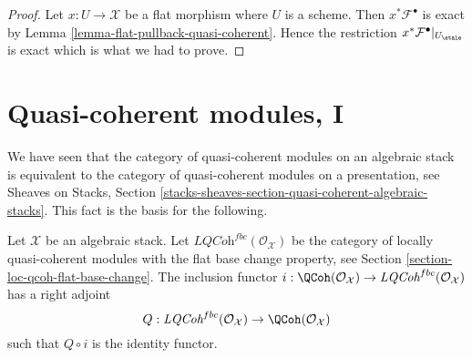\begin{proof}
Let $x : U \to \mathcal{X}$ be a flat morphism where $U$ is a scheme.
Then $x^*\mathcal{F}^\bullet$ is exact by
Lemma \ref{lemma-flat-pullback-quasi-coherent}.
Hence the restriction $x^*\mathcal{F}^\bullet|_{U_\etale}$
is exact which is what we had to prove.
\end{proof}





\section{Quasi-coherent modules, I}
\label{section-quasi-coherent}

\noindent
We have seen that the category of quasi-coherent modules on an algebraic
stack is equivalent to the category of quasi-coherent modules on a
presentation, see
Sheaves on Stacks, Section
\ref{stacks-sheaves-section-quasi-coherent-algebraic-stacks}.
This fact is the basis for the following.

\begin{lemma}
\label{lemma-adjoint}
Let $\mathcal{X}$ be an algebraic stack. Let
$\textit{LQCoh}^{fbc}(\mathcal{O}_\mathcal{X})$
be the category of locally quasi-coherent modules with the
flat base change property, see
Section \ref{section-loc-qcoh-flat-base-change}.
The inclusion functor
$i : \QCoh(\mathcal{O}_\mathcal{X}) \to
\textit{LQCoh}^{fbc}(\mathcal{O}_\mathcal{X})$
has a right adjoint
$$
Q : \textit{LQCoh}^{fbc}(\mathcal{O}_\mathcal{X}) \to
\QCoh(\mathcal{O}_\mathcal{X})
$$
such that $Q \circ i$ is the identity functor.
\end{lemma}

